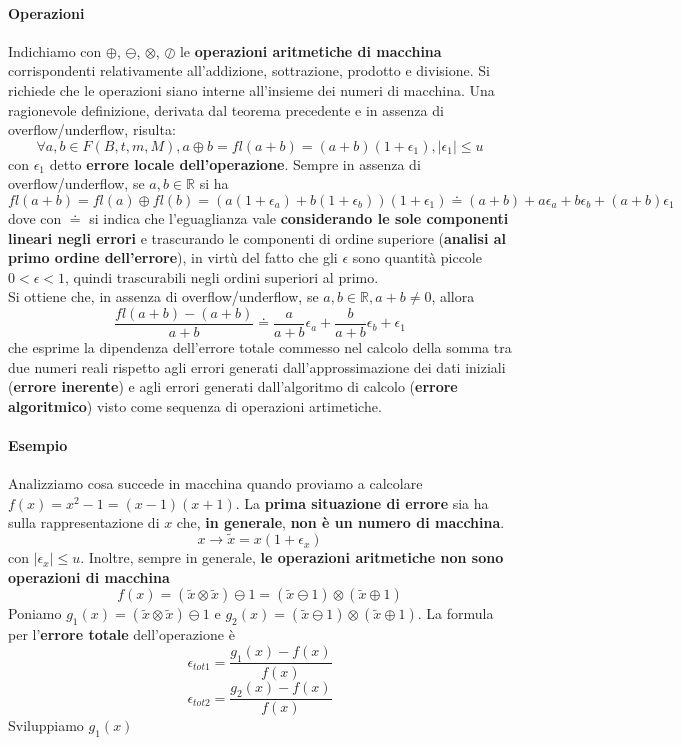\documentclass[10pt]{book}
\begin{document}
\paragraph{Operazioni} Indichiamo con $\oplus$, $\ominus$, $\otimes$, $\oslash$ le \textbf{operazioni aritmetiche di macchina} corrispondenti relativamente all'addizione, sottrazione, prodotto e divisione. Si richiede che le operazioni siano interne all'insieme dei numeri di macchina. Una ragionevole definizione, derivata dal teorema precedente e in assenza di overflow/underflow, risulta: $$\forall a, b \in F(B, t, m, M), a \oplus b = fl(a + b) = (a + b)(1 + \epsilon_1), |\epsilon_1| \leq u$$ con $\epsilon_1$ detto  \textbf{errore locale dell'operazione}. Sempre in assenza di overflow/underflow, se $a, b \in \mathbb{R}$ si ha $$fl(a + b) = fl(a)\oplus fl(b) = (a(1 + \epsilon_a) + b(1 + \epsilon_b))(1 + \epsilon_1) \doteq (a + b) + a\epsilon_a + b\epsilon_b + (a + b)\epsilon_1$$ dove con $\doteq$ si indica che l'eguaglianza vale \textbf{considerando le sole componenti lineari negli errori} e trascurando le componenti di ordine superiore (\textbf{analisi al primo ordine dell'errore}), in virtù del fatto che gli $\epsilon$ sono quantità piccole $0 < \epsilon < 1$, quindi trascurabili negli ordini superiori al primo.\\
Si ottiene che, in assenza di overflow/underflow, se $a, b \in \mathbb{R}, a + b \neq 0$, allora $$\frac{fl(a + b) - (a + b)}{a + b} \doteq \frac{a}{a + b}\epsilon_a + \frac{b}{a + b}\epsilon_b + \epsilon_1$$ che esprime la dipendenza dell'errore totale commesso nel calcolo della somma tra due numeri reali rispetto agli errori generati dall'approssimazione dei dati iniziali (\textbf{errore inerente}) e agli errori generati dall'algoritmo di calcolo (\textbf{errore algoritmico}) visto come sequenza di operazioni artimetiche.
\paragraph{Esempio}
Analizziamo cosa succede in macchina quando proviamo a calcolare $f(x) = x^2 - 1 = (x - 1)(x + 1)$. La \textbf{prima situazione di errore} sia ha sulla rappresentazione di $x$ che, \textbf{in generale}, \textbf{non è un numero di macchina}.$$x \rightarrow \tilde{x} = x(1 + \epsilon_x)$$ con $|\epsilon_x| \leq u$. Inoltre, sempre in generale, \textbf{le operazioni aritmetiche non sono operazioni di macchina} $$f(x) = (\tilde{x} \otimes \tilde{x}) \ominus 1 = (\tilde{x} \ominus 1)\otimes(\tilde{x} \oplus 1)$$Poniamo $g_1(x) = (\tilde{x} \otimes \tilde{x}) \ominus 1$ e $g_2(x) = (\tilde{x} \ominus 1)\otimes(\tilde{x} \oplus 1)$. La formula per l'\textbf{errore totale} dell'operazione è $$\epsilon_{tot1} = \frac{g_1(x) - f(x)}{f(x)}$$ $$\epsilon_{tot2} = \frac{g_2(x) - f(x)}{f(x)}$$ Sviluppiamo $g_1(x)$
\end{document}
